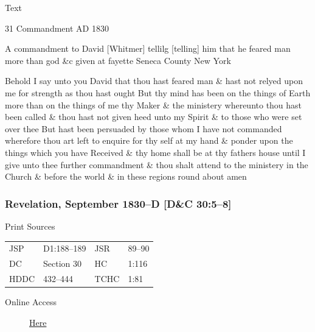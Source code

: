 			\begin{description}
				\item[Text]
			\end{description}
			
				\begin{tightcenter}
				31 Commandment AD 1830
				\end{tightcenter}
				
				A commandment to David [Whitmer] tellilg [telling] him that he feared man more than god \&c given at fayette Seneca County New York
				
				Behold I say unto you David that thou hast feared man \& hast not relyed upon me for strength as thou hast ought But thy mind has been on the things of Earth more than on the things of me thy Maker \& the ministery whereunto thou hast been called \& thou hast not given heed unto my Spirit \& to those who were set over thee But hast been persuaded by those whom I have not commanded wherefore thou art left to enquire for thy self at my hand \& ponder upon the things which you have Received \& thy home shall be at thy fathers house until I give unto thee further commandment \& thou shalt attend to the ministery in the Church \& before the world \& in these regions round about amen
				
		\subsubsection{Revelation, September 1830--D [D\&C 30:5--8]}
			\label{EMS-1830-JS-SEP-1830-D}
		
			\begin{description}
				\item[Print Sources]
			\end{description}

				\begin{tabular}{p{0.5in}p{1in}p{0.5in}p{1in}}
				JSP	 	& D1:188--189	& JSR 		& 89--90 \\
				DC	 	& Section 30	& HC 		& 1:116 \\
				HDDC 	& 432--444		& TCHC 		& 1:81 \\
				\end{tabular}
			
			\begin{description}
				\item[Online Access] \href{https://www.josephsmithpapers.org/paper-summary/revelation-september-1830-d-dc-305-8/1}{Here}
			\end{description}
			
